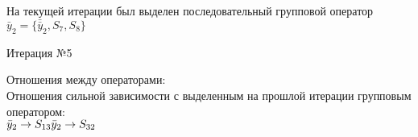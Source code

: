 \documentclass[a4paper,14pt]{article}
\begin{document}
%
На текущей итерации был выделен последовательный групповой оператор $\bar{y}_{2} = \{\bar{\bar{y}}_{2}, S_{7}, S_{8}\}$
\\
\begin{center} Итерация №5 \end{center}
Отношения между операторами: \\
Отношения сильной зависимости с выделенным на прошлой итерации групповым оператором: \\ \newline
\begin{math}
    \bar{y}_{2} \rightarrow S_{13} \\ 
\bar{y}_{2} \rightarrow S_{32}
\end{math} \\ \\ \\ 
%
\end{document}
